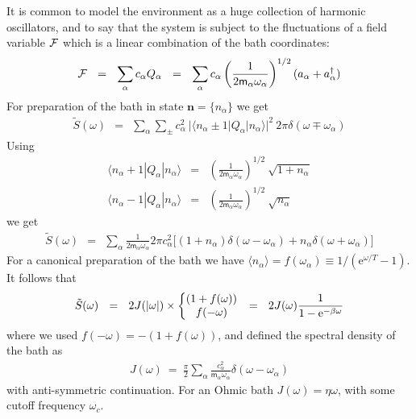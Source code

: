 \documentclass[onecolumn,fleqn]{revtex4}
\newcommand{\eexp}{\mathrm{e}^}
\newcommand{\amatrix}[1]{\begin{matrix} #1 \end{matrix}}
\newcommand{\beq}{\begin{eqnarray}}
\newcommand{\eeq}{\end{eqnarray}}
\begin{document}
It is common to model the environment as a huge 
collection of harmonic oscillators, and to say that 
the system is subject to the fluctuations 
of a field variable ${\cal F}$ which is a linear 
combination of the bath coordinates: 
\beq
{\cal F} 
\ \ = \ \ 
\sum_{\alpha} c_{\alpha}Q_{\alpha} 
\ \ = \ \ 
\sum_{\alpha} c_{\alpha} 
\left(\frac{1}{2 \mathsf{m}_{\alpha} \omega_{\alpha}} \right)^{1/2} 
(a_{\alpha} + a_{\alpha}^{\dag})
\eeq
For preparation of the bath 
in state $\bm{n}=\{n_{\alpha}\}$
we get 
\beq
\tilde{S}(\omega)
\ \ = \ \ 
\sum_{\alpha}\sum_{\pm} 
c_{\alpha}^2
\ |\langle n_{\alpha}{\pm}1 | Q_{\alpha} | n_{\alpha} \rangle|^2 
\ 2\pi\delta(\omega\mp\omega_{\alpha})
\eeq
Using
\beq
\langle n_{\alpha}{+}1 | Q_{\alpha} | n_{\alpha} \rangle &=& 
\left(\frac{1}{2 \mathsf{m}_{\alpha} \omega_{\alpha}} \right)^{1/2}
\ \sqrt{1 + n_{\alpha}}
\\
\langle n_{\alpha}{-}1 | Q_{\alpha} | n_{\alpha} \rangle &=& 
\left( \frac{1}{2 \mathsf{m}_{\alpha} \omega_{\alpha}} \right)^{1/2}
\ \sqrt{n_{\alpha}}
\eeq
we get
\beq
\tilde{S}(\omega) 
\ \ = \ \
\sum_{\alpha} 
\frac{1}{2\mathsf{m}_{\alpha} \omega_{\alpha}}
2\pi c_{\alpha}^2  \Big[ 
(1 {+} n_{\alpha}) \delta(\omega-\omega_{\alpha})
+ n_{\alpha} \delta(\omega+\omega_{\alpha})
\Big]
\eeq
For a canonical preparation of the bath 
we have $\langle n_{\alpha} \rangle = f(\omega_{\alpha}) \equiv 1/(\eexp{\omega/T}-1)$. 
It follows that  
\beq
\tilde{S}(\omega) 
\ \ = \ \ 
2J(|\omega|) \times 
\left\{\amatrix{   
(1 + f(\omega)) \cr
f(-\omega) 
}\right. 
\ \ = \ \ 
2J(\omega)\frac{1}{1-\eexp{-\beta\omega}} 
\eeq
where we used ${f(-\omega)=-(1+f(\omega))}$, 
and defined the spectral density of the bath as 
\beq
J(\omega) \ = \ \frac{\pi}{2} \sum_{\alpha}
\frac{c_{\alpha}^2}{\mathsf{m}_{\alpha} \omega_{\alpha}}
\delta(\omega-\omega_{\alpha}) 
\eeq
with anti-symmetric continuation. 
For an Ohmic bath $J(\omega)=\eta\omega$,  
with some cutoff frequency $\omega_c$. 


 
\end{document}
